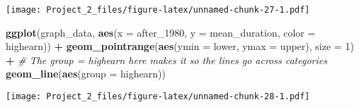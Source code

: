 \documentclass[
]{article}
\newenvironment{Shaded}{\begin{snugshade}}{\end{snugshade}}
\newcommand{\AttributeTok}[1]{\textcolor[rgb]{0.13,0.29,0.53}{#1}}
\newcommand{\CommentTok}[1]{\textcolor[rgb]{0.56,0.35,0.01}{\textit{#1}}}
\newcommand{\DecValTok}[1]{\textcolor[rgb]{0.00,0.00,0.81}{#1}}
\newcommand{\FunctionTok}[1]{\textcolor[rgb]{0.13,0.29,0.53}{\textbf{#1}}}
\newcommand{\NormalTok}[1]{#1}
\newcommand{\SpecialCharTok}[1]{\textcolor[rgb]{0.81,0.36,0.00}{\textbf{#1}}}
\begin{document}
\texttt{[image: Project\_2\_files/figure-latex/unnamed-chunk-27-1.pdf]}

\begin{Shaded}
\begin{Highlighting}[]
\FunctionTok{ggplot}\NormalTok{(graph\_data, }\FunctionTok{aes}\NormalTok{(}\AttributeTok{x =}\NormalTok{ after\_1980, }\AttributeTok{y =}\NormalTok{ mean\_duration, }\AttributeTok{color =}\NormalTok{ highearn)) }\SpecialCharTok{+}
  \FunctionTok{geom\_pointrange}\NormalTok{(}\FunctionTok{aes}\NormalTok{(}\AttributeTok{ymin =}\NormalTok{ lower, }\AttributeTok{ymax =}\NormalTok{ upper), }\AttributeTok{size =} \DecValTok{1}\NormalTok{) }\SpecialCharTok{+} 
  \CommentTok{\# The group = highearn here makes it so the lines go across categories}
  \FunctionTok{geom\_line}\NormalTok{(}\FunctionTok{aes}\NormalTok{(}\AttributeTok{group =}\NormalTok{ highearn))}
\end{Highlighting}
\end{Shaded}

\texttt{[image: Project\_2\_files/figure-latex/unnamed-chunk-28-1.pdf]}
\end{document}
